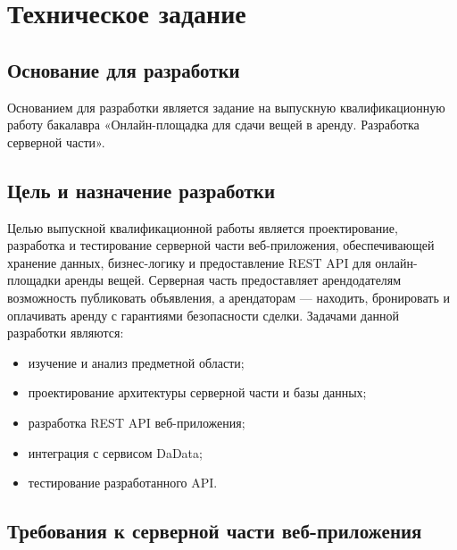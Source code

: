 \section{Техническое задание}
\subsection{Основание для разработки}
Основанием для разработки является задание на выпускную квалификационную работу бакалавра «Онлайн-площадка для сдачи вещей в аренду. Разработка серверной части».
\subsection{Цель и назначение разработки}
Целью выпускной квалификационной работы является проектирование, разработка и тестирование серверной части веб-приложения, обеспечивающей хранение данных, бизнес-логику и предоставление REST API для онлайн-площадки аренды вещей. Серверная часть предоставляет арендодателям возможность публиковать объявления, а арендаторам — находить, бронировать и оплачивать аренду с гарантиями безопасности сделки.
Задачами данной разработки являются:
\begin{itemize}
\item изучение и анализ предметной области;
\item проектирование архитектуры серверной части и базы данных;
\item разработка REST API веб-приложения;
\item интеграция с  сервисом DaData;
\item тестирование разработанного API.
\end{itemize}
\subsection{Требования к серверной части веб-приложения}

